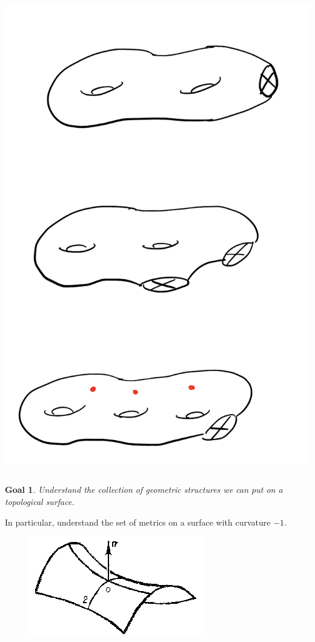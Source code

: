 \documentclass[8pt]{beamer}
\newtheorem{goal}[theorem]{Goal}
\begin{document}
\begin{frame}
\begin{columns}
\begin{column}{0.5\textwidth}
\begin{center}
      \includegraphics[scale=0.15]{nonorientable.png}
     \end{center}
\end{column}
\end{columns}
\end{frame}

\begin{frame}
  \begin{goal}
    Understand the collection of geometric structures we can put on a topological surface.
  \end{goal}
  \pause
  In particular, understand the set of metrics on a surface with curvature $-1$.
  \begin{figure}[h]
    \centering
    \includegraphics[scale=0.5]{negative-curvature.png}
  \end{figure}
\end{frame}
\end{document}

